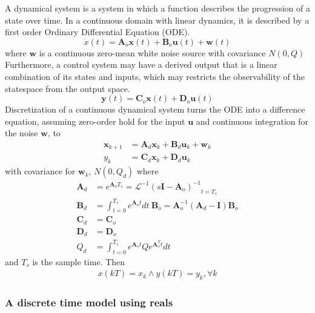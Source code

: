 \documentclass[twocolumn]{autart}    %
\newcommand{\mat}[1]{\boldsymbol{#1}}
\renewcommand{\vec}[1]{\boldsymbol{#1}}
\begin{document}
A dynamical system is a system in which a function describes the progression
of a state over time.  In a continuous domain with linear dynamics, it is
described by a first order Ordinary Differential Equation (ODE).
%
\begin{equation}
\dot{x}(t)=\mat{A}_o\vec{x}(t)+\mat{B}_o\vec{u}(t) +\vec{w}(t)
\label{eq:dynamical}
\end{equation}
%
where $\vec{w}$  is a continuous zero-mean white noise source with
covariance $N ( 0 , Q )$ Furthermore, a control system may have a derived
output that is a linear combination of its states and inputs, which may
restricts the observability of the statespace from the output space.
%
\begin{equation}
\vec{y}(t)=\mat{C}_o\vec{x}(t)+\mat{D}_o\vec{u}(t)
\end{equation}
%
Discretization of a continuous dynamical system turns the ODE into a
difference equation, assuming zero-order hold for the input $\vec{u}$ and
continuous integration for the noise $\vec{w}$, to
%
\begin{align}
\label{eq:discretization}
\vec{x}_{k+1} &= \mat{A}_d\vec{x}_k+\mat{B}_d\vec{u}_k + \vec{w}_k\\
y_k &= \mat{C}_d \vec{x}_ k + \mat{D}_d \vec{u}_ k 
\end{align}
with covariance for $\vec{w}_k$, $N ( 0 , Q_d )$
where
\begin{align}
\label{eq:discretize}
\mat{A}_d &= e^{\mat{A}_o T_s} = \mathcal{L}^{-1} { ( s \mat{I} - \mat{A}_o )^{-1} }_{t = T_s}\\
\mat{B}_d &= \int_{t = 0}^{T_s} e^{\mat{A}_o t} dt\ \mat{B}_o = \mat{A}_o^{-1} ( \mat{A}_d - \mat{I} ) \mat{B}_o\\
\mat{C}_d &= \mat{C}_o\\
\mat{D}_d &= \mat{D}_o \\
Q_d &= \int_{t = 0}^{T_s} e^{\mat{A}_o t} Q e^{\mat{A}_o^T t} dt
\end{align}
and $T_s$ is the sample time. Then
\begin{align*}
x(kT)=x_k \wedge y(kT) = y_k, \forall k
\end{align*}

 \subsubsection{A discrete time model using reals}
 \label{sec:real_aa}
\end{document}
